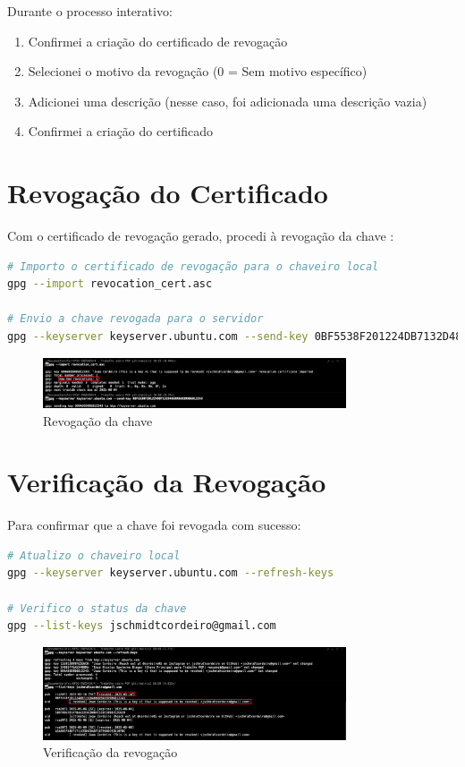 Durante o processo interativo:
\begin{enumerate}
    \item Confirmei a criação do certificado de revogação
    \item Selecionei o motivo da revogação (0 = Sem motivo específico)
    \item Adicionei uma descrição (nesse caso, foi adicionada uma descrição vazia)
    \item Confirmei a criação do certificado
\end{enumerate}

\section{Revogação do Certificado}
Com o certificado de revogação gerado, procedi à revogação da chave \cite{rfc4880}:

\begin{lstlisting}[language=bash]
# Importo o certificado de revogação para o chaveiro local
gpg --import revocation_cert.asc

# Envio a chave revogada para o servidor
gpg --keyserver keyserver.ubuntu.com --send-key 0BF5538F201224DB7132D486DD9A93D9B6812243
\end{lstlisting}

\begin{figure}[!htb]
    \centering
    \includegraphics[width=0.8\textwidth]{images/02-revogacao_chave.jpeg}
    \caption{Revogação da chave}
    \label{fig:revogacao-chave}
\end{figure}

\section{Verificação da Revogação}
Para confirmar que a chave foi revogada com sucesso:

\begin{lstlisting}[language=bash]
# Atualizo o chaveiro local
gpg --keyserver keyserver.ubuntu.com --refresh-keys

# Verifico o status da chave
gpg --list-keys jschmidtcordeiro@gmail.com
\end{lstlisting}

\begin{figure}[!htb]
    \centering
    \includegraphics[width=0.8\textwidth]{images/02-verificacao_revogacao_chave.jpeg}
    \caption{Verificação da revogação}
    \label{fig:verificacao-revogacao}
\end{figure}

